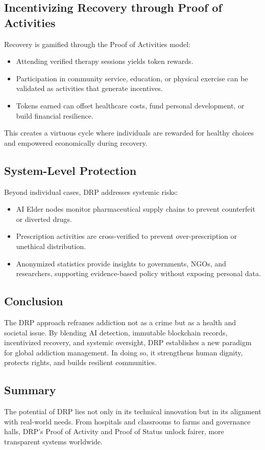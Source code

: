 \documentclass[11pt,a4paper]{article}
\begin{document}
\subsection{Incentivizing Recovery through Proof of Activities}
Recovery is gamified through the Proof of Activities model:
\begin{itemize}
    \item Attending verified therapy sessions yields token rewards.
    \item Participation in community service, education, or physical exercise can be validated as activities that generate incentives.
    \item Tokens earned can offset healthcare costs, fund personal development, or build financial resilience.
\end{itemize}
This creates a virtuous cycle where individuals are rewarded for healthy choices and empowered economically during recovery.

\subsection{System-Level Protection}
Beyond individual cases, DRP addresses systemic risks:
\begin{itemize}
    \item AI Elder nodes monitor pharmaceutical supply chains to prevent counterfeit or diverted drugs.
    \item Prescription activities are cross-verified to prevent over-prescription or unethical distribution.
    \item Anonymized statistics provide insights to governments, NGOs, and researchers, supporting evidence-based policy without exposing personal data.
\end{itemize}

\subsection{Conclusion}
The DRP approach reframes addiction not as a crime but as a health and societal issue. By blending AI detection, immutable blockchain records, incentivized recovery, and systemic oversight, DRP establishes a new paradigm for global addiction management. In doing so, it strengthens human dignity, protects rights, and builds resilient communities.


\subsection{Summary}
The potential of DRP lies not only in its technical innovation but in its alignment with real-world needs. From hospitals and classrooms to farms and governance halls, DRP’s Proof of Activity and Proof of Status unlock fairer, more transparent systems worldwide.
\end{document}
